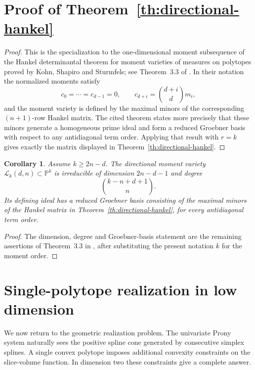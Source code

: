 \documentclass[reqno]{amsart}
\numberwithin{theorem}{section}
\newtheorem{corollary}[theorem]{Corollary}
\newcommand{\PP}{\mathbb{P}}
\begin{document}
\section{Proof of Theorem~\ref{th:directional-hankel}}

\begin{proof}
This is the specialization to the one-dimensional moment subsequence of the Hankel determinantal theorem for moment varieties of measures on polytopes proved by Kohn, Shapiro and Sturmfels; see Theorem~3.3 of \cite{KSS}. In their notation the normalized moments satisfy
\[
c_0=\cdots=c_{d-1}=0,\qquad c_{d+i}=\binom{d+i}{d}m_i,
\]
and the moment variety is defined by the maximal minors of the corresponding $(n+1)$-row Hankel matrix. The cited theorem states more precisely that these minors generate a homogeneous prime ideal and form a reduced Groebner basis with respect to any antidiagonal term order. Applying that result with $r=k$ gives exactly the matrix displayed in Theorem~\ref{th:directional-hankel}. 
\end{proof}

\begin{corollary}\label{cor:degree}
Assume $k\ge 2n-d$. The directional moment variety $\mathcal L_k(d,n)\subset\PP^k$ is irreducible of dimension $2n-d-1$ and degree
\[
\binom{k-n+d+1}{n}.
\]
Its defining ideal has a reduced Groebner basis consisting of the maximal minors of the Hankel matrix in Theorem~\ref{th:directional-hankel}, for every antidiagonal term order.
\end{corollary}

\begin{proof}
The dimension, degree and Groebner-basis statement are the remaining assertions of Theorem~3.3 in \cite{KSS}, after substituting the present notation $k$ for the moment order.
\end{proof}




\section{Single-polytope realization in low dimension}\label{sec:single-polytope}

We now return to the geometric realization problem.  The univariate Prony system naturally sees the positive spline cone generated by consecutive simplex splines.  A single convex polytope imposes additional convexity constraints on the slice-volume function.  In dimension two these constraints give a complete answer.
\end{document}
